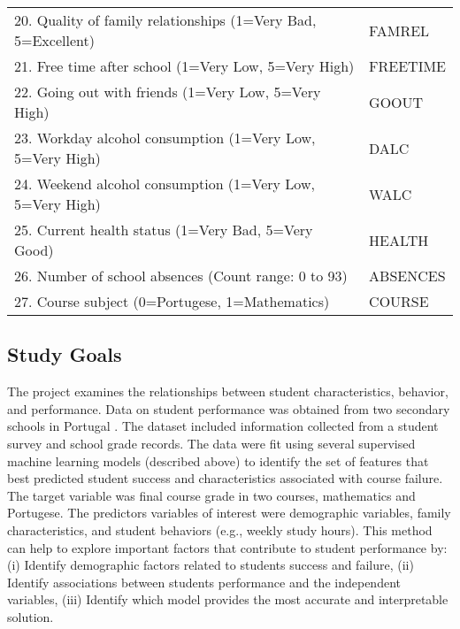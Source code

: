 \documentclass[sigconf]{acmart}
\begin{document}
\begin{table*}[ht]
\begin{tabular}{ll}
    20. Quality of family relationships (1=Very Bad, 5=Excellent) & FAMREL  \\
    21. Free time after school (1=Very Low, 5=Very High) & FREETIME  \\
    22. Going out with friends (1=Very Low, 5=Very High) & GOOUT  \\
    23. Workday alcohol consumption (1=Very Low, 5=Very High) & DALC  \\
    24. Weekend alcohol consumption (1=Very Low, 5=Very High) & WALC  \\
    25. Current health status (1=Very Bad, 5=Very Good) & HEALTH  \\ 
    26. Number of school absences (Count range: 0 to 93) & ABSENCES  \\
    27. Course subject (0=Portugese, 1=Mathematics) & COURSE  \\
    \bottomrule
  \end{tabular}
\end{table*}


\subsection{Study Goals} 

The project examines the relationships between student characteristics,  
behavior, and performance. Data on student performance was obtained from two 
secondary schools in Portugal \cite{cortez08}. The dataset included information
collected from a student survey and school grade records. The data were fit
using several supervised machine learning models (described above) to identify 
the set of features that best predicted student success and characteristics 
associated with course failure. The target variable was final course grade in 
two courses, mathematics and Portugese. The predictors variables of interest 
were demographic variables, family characteristics, and student behaviors 
(e.g., weekly study hours). This method can help to explore important factors 
that contribute to student performance by: (i) Identify demographic factors 
related to students success and failure, (ii) Identify associations between 
students performance and the independent variables, (iii) Identify which model
provides the most accurate and interpretable solution. 

\end{document}
